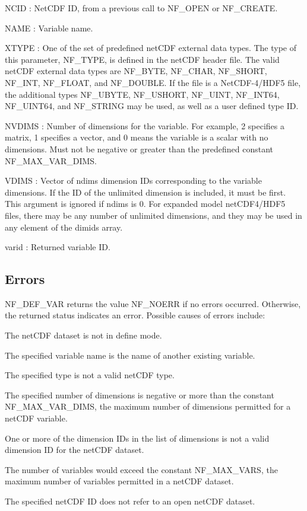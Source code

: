 {\ttfamily N\+C\+ID} \+: Net\+C\+DF ID, from a previous call to N\+F\+\_\+\+O\+P\+EN or N\+F\+\_\+\+C\+R\+E\+A\+TE.

{\ttfamily N\+A\+ME} \+: Variable name.

{\ttfamily X\+T\+Y\+PE} \+: One of the set of predefined net\+C\+DF external data types. The type of this parameter, N\+F\+\_\+\+T\+Y\+PE, is defined in the net\+C\+DF header file. The valid net\+C\+DF external data types are N\+F\+\_\+\+B\+Y\+TE, N\+F\+\_\+\+C\+H\+AR, N\+F\+\_\+\+S\+H\+O\+RT, N\+F\+\_\+\+I\+NT, N\+F\+\_\+\+F\+L\+O\+AT, and N\+F\+\_\+\+D\+O\+U\+B\+LE. If the file is a Net\+C\+D\+F-\/4/\+H\+D\+F5 file, the additional types N\+F\+\_\+\+U\+B\+Y\+TE, N\+F\+\_\+\+U\+S\+H\+O\+RT, N\+F\+\_\+\+U\+I\+NT, N\+F\+\_\+\+I\+N\+T64, N\+F\+\_\+\+U\+I\+N\+T64, and N\+F\+\_\+\+S\+T\+R\+I\+NG may be used, as well as a user defined type ID.

{\ttfamily N\+V\+D\+I\+MS} \+: Number of dimensions for the variable. For example, 2 specifies a matrix, 1 specifies a vector, and 0 means the variable is a scalar with no dimensions. Must not be negative or greater than the predefined constant N\+F\+\_\+\+M\+A\+X\+\_\+\+V\+A\+R\+\_\+\+D\+I\+MS.

{\ttfamily V\+D\+I\+MS} \+: Vector of ndims dimension I\+Ds corresponding to the variable dimensions. If the ID of the unlimited dimension is included, it must be first. This argument is ignored if ndims is 0. For expanded model net\+C\+D\+F4/\+H\+D\+F5 files, there may be any number of unlimited dimensions, and they may be used in any element of the dimids array.

{\ttfamily varid} \+: Returned variable ID.

\subsection*{Errors }

N\+F\+\_\+\+D\+E\+F\+\_\+\+V\+AR returns the value N\+F\+\_\+\+N\+O\+E\+RR if no errors occurred. Otherwise, the returned status indicates an error. Possible causes of errors include\+:


\begin{DoxyItemize}
\item The net\+C\+DF dataset is not in define mode.
\item The specified variable name is the name of another existing variable.
\item The specified type is not a valid net\+C\+DF type.
\item The specified number of dimensions is negative or more than the constant N\+F\+\_\+\+M\+A\+X\+\_\+\+V\+A\+R\+\_\+\+D\+I\+MS, the maximum number of dimensions permitted for a net\+C\+DF variable.
\item One or more of the dimension I\+Ds in the list of dimensions is not a valid dimension ID for the net\+C\+DF dataset.
\item The number of variables would exceed the constant N\+F\+\_\+\+M\+A\+X\+\_\+\+V\+A\+RS, the maximum number of variables permitted in a net\+C\+DF dataset.
\item The specified net\+C\+DF ID does not refer to an open net\+C\+DF dataset.
\end{DoxyItemize}

